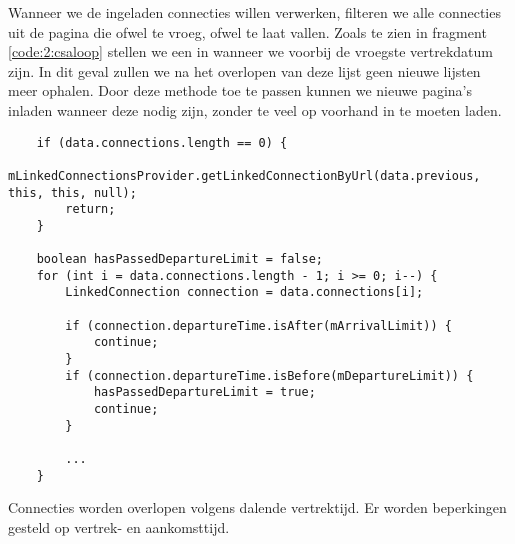 Wanneer we de ingeladen connecties willen verwerken, filteren we alle connecties uit de pagina die ofwel te vroeg, ofwel te laat vallen. Zoals te zien in fragment \ref{code:2:csaloop} stellen we een  in wanneer we voorbij de vroegste vertrekdatum zijn. In dit geval zullen we na het overlopen van deze lijst geen nieuwe lijsten meer ophalen. Door deze methode toe te passen kunnen we nieuwe pagina's inladen wanneer deze nodig zijn, zonder te veel op voorhand in te moeten laden.

\begin{code}
\begin{verbatim}
	if (data.connections.length == 0) {
		mLinkedConnectionsProvider.getLinkedConnectionByUrl(data.previous, this, this, null);
		return;
	}
	
	boolean hasPassedDepartureLimit = false;
	for (int i = data.connections.length - 1; i >= 0; i--) {
		LinkedConnection connection = data.connections[i];
		
		if (connection.departureTime.isAfter(mArrivalLimit)) {
			continue;
		}
		if (connection.departureTime.isBefore(mDepartureLimit)) {
			hasPassedDepartureLimit = true;
			continue;
		}
		
		...
	}
	\end{verbatim}
			\caption[CSA: Overlopen van connecties]{Connecties worden overlopen volgens dalende vertrektijd. Er worden beperkingen gesteld op vertrek- en aankomsttijd.}
	\label{code:2:csaloop}
\end{code}

